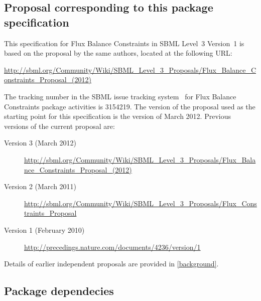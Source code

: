 \subsection{Proposal corresponding to this package specification}

This specification for Flux Balance Constraints in SBML Level~3
Version~1 is based on the proposal by the same authors, located at the
following URL:

\begin{center}
  \vspace*{1ex}\small
  \url{http://sbml.org/Community/Wiki/SBML_Level_3_Proposals/Flux_Balance_Constraints_Proposal_(2012)}
  \vspace*{1ex}
\end{center}

The tracking number in the SBML issue tracking system~\citep{tracker}
for Flux Balance Constraints package activities is 3154219.  The
version of the proposal used as the starting point for this
specification is the version of March 2012. Previous versions of the current proposal are:
\begin{description}
  \item[Version 3 (March 2012)]
  \item [] \small{\url{http://sbml.org/Community/Wiki/SBML_Level_3_Proposals/Flux_Balance_Constraints_Proposal_(2012)}}
  \item[Version 2 (March 2011)]
  \item [] \small{\url{http://sbml.org/Community/Wiki/SBML_Level_3_Proposals/Flux_Constraints_Proposal}}
  \item[Version 1 (February 2010)]
  \item [] \small{\url{http://precedings.nature.com/documents/4236/version/1}}
\end{description}
Details of earlier independent proposals are provided in \ref{background}.


\subsection{Package dependecies}

